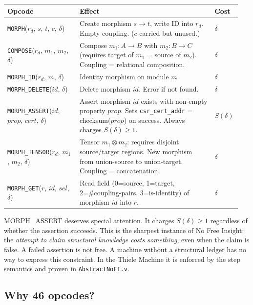 \documentclass[11pt,a4paper]{article}
\theoremstyle{plain}
\theoremstyle{definition}
\theoremstyle{remark}
\begin{document}
\begin{center}
\begin{tabular}{@{}p{0.30\linewidth}p{0.56\linewidth}p{0.09\linewidth}@{}}
\toprule
Opcode & Effect & Cost \\
\midrule
\texttt{MORPH}($r_d$, $s$, $t$, $c$, $\delta$) & Create morphism $s \to t$, write ID into $r_d$. Empty coupling. ($c$ carried but unused.) & $\delta$ \\[0.3em]
\texttt{COMPOSE}($r_d$, $m_1$, $m_2$, $\delta$) & Compose $m_1 : A \to B$ with $m_2 : B \to C$ (requires target of $m_1$ = source of $m_2$). Coupling = relational composition. & $\delta$ \\[0.3em]
\texttt{MORPH\_ID}($r_d$, $m$, $\delta$) & Identity morphism on module $m$. & $\delta$ \\[0.3em]
\texttt{MORPH\_DELETE}($\mathit{id}$, $\delta$) & Delete morphism $\mathit{id}$. Error if not found. & $\delta$ \\[0.3em]
\texttt{MORPH\_ASSERT}($\mathit{id}$, $\mathit{prop}$, $\mathit{cert}$, $\delta$) & Assert morphism $\mathit{id}$ exists with non-empty property $\mathit{prop}$. Sets \texttt{csr\_cert\_addr} = checksum($\mathit{prop}$) on success. Always charges $S(\delta) \geq 1$. & $S(\delta)$ \\[0.3em]
\texttt{MORPH\_TENSOR}($r_d$, $m_1$, $m_2$, $\delta$) & Tensor $m_1 \otimes m_2$: requires disjoint source/target regions. New morphism from union-source to union-target. Coupling = concatenation. & $\delta$ \\[0.3em]
\texttt{MORPH\_GET}($r$, $\mathit{id}$, $\mathit{sel}$, $\delta$) & Read field (0=source, 1=target, 2=\#coupling-pairs, 3=is-identity) of morphism $\mathit{id}$ into $r$. & $\delta$ \\
\bottomrule
\end{tabular}
\end{center}

MORPH\_ASSERT deserves special attention. It charges $S(\delta) \geq 1$ regardless of whether the assertion succeeds. This is the sharpest instance of No Free Insight: the \emph{attempt to claim structural knowledge costs something}, even when the claim is false. A failed assertion is not free. A machine without a structural ledger has no way to express this constraint. In the Thiele Machine it is enforced by the step semantics and proven in \texttt{AbstractNoFI.v}.

\subsection{Why 46 opcodes?}
\end{document}
